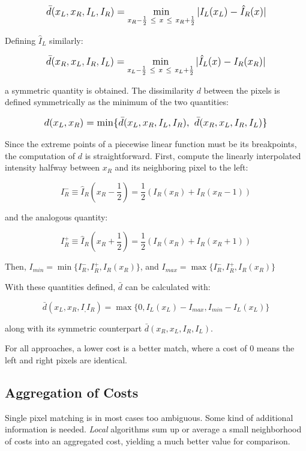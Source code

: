 \[ \mathlarger{\bar{d}(x_L, x_R, I_L, I_R) = \min_{x_R - \frac{1}{2}\  \le\  x\ \le \ x_R + \frac{1}{2}} | I_L(x_L) - \hat{I}_R(x) |} \]

Defining $\hat{I}_L$ similarly:

\[\mathlarger{
  \bar{d}(x_R, x_L, I_R, I_L) = \min_{x_L - \frac{1}{2}\  \le\  x\
    \le \ x_L + \frac{1}{2}} | \hat{I}_L(x) - I_R(x_R) |
}\]

a symmetric quantity is obtained. The dissimilarity $d$ between the
pixels is defined symmetrically as the minimum of the two quantities:

\begin{equation}
\label{eq:btd}
  \mathlarger{
    d(x_L,x_R) = \min \{\bar{d}(x_L,x_R,I_L,I_R),\  \bar{d}(x_R,x_L,I_R,I_L) \}
  }
\end{equation}

Since the extreme points of a piecewise linear function must be its
breakpoints, the computation of $d$ is straightforward. First,
compute the linearly interpolated intensity halfway between $x_R$ and its
neighboring pixel to the left:

\[
I^{-}_{R} \equiv{} \hat{I}_R ( x_R - \frac{1}{2}) =
\frac{1}{2}(I_R(x_R) + I_R(x_R - 1))
\]

and the analogous quantity:

\[
I^{+}_{R} \equiv{} \hat{I}_R ( x_R + \frac{1}{2}) =
\frac{1}{2}(I_R(x_R) + I_R(x_R + 1))
\]

Then, $I_{min} = \min\{I^{-}_{R},I^{+}_{R},I_{R}(x_R)\}$, and $I_{max}
= \max\{I^{-}_{R},I^{+}_{R},I_{R}(x_R)\}$

With these quantities defined, $\bar{d}$ can be calculated with:

\[
\bar{d}(x_L,x_R,I_,I_R) = \max\{0,I_L(x_L) - I_{max},I_{min} - I_L(x_L)\}
\]

along with its symmetric counterpart $\bar{d}(x_R,x_L,I_R,I_L)$. 

For all approaches, a lower cost is a better match, where a cost of 0
means the left and right pixels are identical.

\subsection{Aggregation of Costs}
\label{sec:aggregatecost}

Single pixel matching is in most cases too ambiguous. Some kind of
additional information is needed. \textit{Local} algorithms sum up or
average a small neighborhood of costs into an aggregated cost,
yielding a much better value for comparison.

